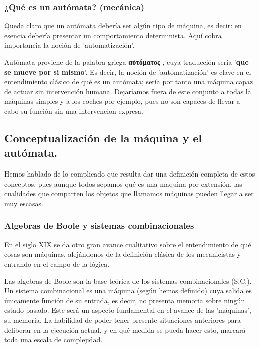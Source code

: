 \subsubsection{¿Qué es un autómata? (mecánica)}

Queda claro que un autómata debería ser algún tipo de máquina, es decir: en esencia debería presentar un comportamiento determinista. Aquí cobra importancia la noción de 'automatización'.

\vspace{10px}

Autómata proviene de la palabra griega \textbf{\textgreek{αὐτόματος}} , cuya traducción seria '\textbf{que se mueve por si mismo}'. Es decir, la noción de 'automatización' es clave en el entendimiento clásico de  qué es un autómata; sería por tanto una máquina capaz de actuar sin intervención humana. Dejaríamos fuera de este conjunto a todas la máquinas simples y a los coches por ejemplo, pues no son capaces de llevar a cabo su función sin una intervencion expresa.




\subsection{Conceptualización de la máquina y el autómata.}

Hemos hablado de lo complicado que resulta dar una definición completa de estos conceptos, pues aunque todos sepamos qué es una maquina por extensión, las cualidades que comparten los objetos que llamamos máquinas pueden llegar a ser muy escasas.

\subsubsection{Algebras de Boole y sistemas combinacionales}

En el siglo XIX se da otro gran avance cualitativo sobre el entendimiento de qué cosas son máquinas, alejándonos de la definición clásica de los mecanicistas y entrando en el campo de la lógica.

\vspace{10px}

Las algebras de Boole son la base teórica de los sistemas combinacionales (S.C.). Un sistema combinacional es una máquina (según hemos definido) cuya salida es únicamente función de su entrada, es decir, no presenta memoria sobre ningún estado pasado. Este será un aspecto fundamental en el avance de las 'máquinas', su memoria. La habilidad de poder tener presente situaciones anteriores para deliberar en la ejecución actual, y en qué medida se pueda hacer esto, marcará toda una escala de complejidad.

